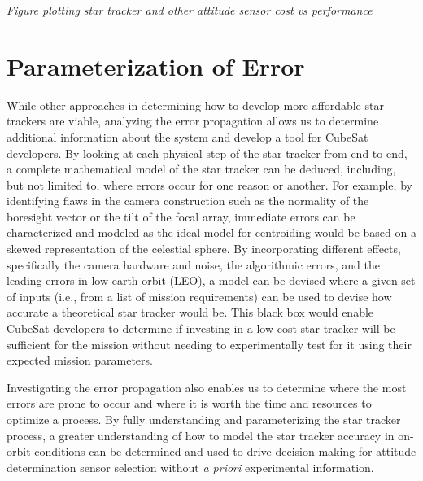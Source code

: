 \begin{center}
    \emph{Figure plotting star tracker and other attitude sensor cost vs performance}
\end{center}

\section*{Parameterization of Error}

\par \qquad While other approaches in determining how to develop more affordable star trackers are viable, analyzing the error propagation allows us to determine additional information about the system and develop a tool for CubeSat developers.
By looking at each physical step of the star tracker from end-to-end, a complete mathematical model of the star tracker can be deduced, including, but not limited to, where errors occur for one reason or another.
For example, by identifying flaws in the camera construction such as the normality of the boresight vector or the tilt of the focal array, immediate errors can be characterized and modeled as the ideal model for centroiding would be based on a skewed representation of the celestial sphere.
By incorporating different effects, specifically the camera hardware and noise, the algorithmic errors, and the leading errors in low earth orbit (LEO), a model can be devised where a given set of inputs (i.e., from a list of mission requirements) can be used to devise how accurate a theoretical star tracker would be.
This black box would enable CubeSat developers to determine if investing in a low-cost star tracker will be sufficient for the mission without needing to experimentally test for it using their expected mission parameters.

\par \qquad Investigating the error propagation also enables us to determine where the most errors are prone to occur and where it is worth the time and resources to optimize a process. 
By fully understanding and parameterizing the star tracker process, a greater understanding of how to model the star tracker accuracy in on-orbit conditions can be determined and used to drive decision making for attitude determination sensor selection without \emph{a priori} experimental information.